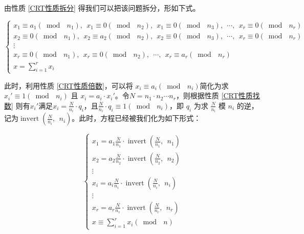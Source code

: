 \documentclass[a4paper]{article}         %
\newcommand{\upcite}[1]{\textsuperscript{\cite{#1}}} %
\begin{document}
由性质 \ref{CRT性质拆分} 得我们可以把该问题拆分，形如下式。

\[
	\begin{cases}
		x_1 \equiv a_1(\bmod \phantom{;} n_1), \phantom{;} x_1 \equiv 0 (\bmod \phantom{;} n_2), \phantom{;} x_1 \equiv 0 (\bmod \phantom{;} n_3), \phantom{;} \cdots, \phantom{;} x_r \equiv 0 (\bmod \phantom{;} n_r)\\
		x_2 \equiv 0(\bmod \phantom{;} n_1), \phantom{;} x_2 \equiv a_2 (\bmod \phantom{;} n_2), \phantom{;} x_2 \equiv 0 (\bmod \phantom{;} n_3), \phantom{;} \cdots, \phantom{;} x_r \equiv 0 (\bmod \phantom{;} n_r)\\
		\vdots\\
		x_r \equiv 0(\bmod \phantom{;} n_1), \phantom{;} x_r \equiv 0 (\bmod \phantom{;} n_2), \phantom{;} \cdots, \phantom{;} x_r \equiv a_r (\bmod \phantom{;} n_r)\\
		x = \sum \limits_{i=1}^{r} x_i
	\end{cases}
\]

此时，利用性质 \ref{CRT性质倍数}，可以将 $x_i \equiv a_i(\bmod \phantom{;} n_i)$简化为求$x_i' \equiv 1 (\bmod \phantom{;} n_i)$ 且 $x_i = a_i \cdot x_i'$。令$N=n_1 \cdot n_2 \cdots n_r$，则根据性质 \ref{CRT性质找数} 则有$x_i'$满足$x_i = \frac{N}{n_i} \cdot q_i$，且$\frac{N}{n_i} \cdot q_i \equiv 1 (\bmod \phantom{;} n_i)$，即 $q_i$ 为求 $\frac{N}{n_i}$ 模 $n_i$ 的逆，记为$\operatorname{invert}(\frac{N}{n_i}, \phantom{;} n_i)$\upcite{中国剩余定理(CRT)}。此时，方程已经被我们化为如下形式：

\[
	\begin{cases}
		x_1 = a_1\frac{N}{n_1} \cdot \operatorname{invert}(\frac{N}{n_1}, \phantom{;} n_1)\\
        x_2 = a_2\frac{N}{n_2} \cdot \operatorname{invert}(\frac{N}{n_2}, \phantom{;} n_2)\\
        \vdots                                      \\
        x_i = a_i\frac{N}{n_i} \cdot \operatorname{invert}(\frac{N}{n_i}, \phantom{;} n_i) \\
        \vdots                                      \\
        x_r = a_r\frac{N}{n_r} \cdot \operatorname{invert}(\frac{N}{n_r}, \phantom{;} n_r)\\
        x \equiv \sum \limits_{i=1}^{r} x_i(\bmod \phantom{;} n)
	\end{cases}
\]
\end{document}
